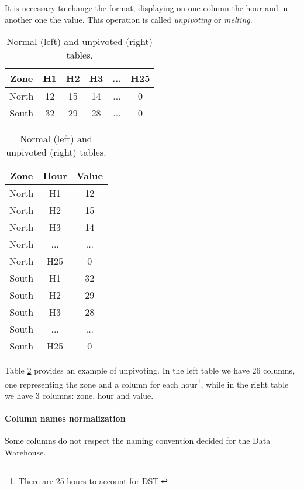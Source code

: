         It is necessary to change the format, displaying on one column the hour and in another one the value.
        This operation is called \textit{unpivoting} or \textit{melting}.
        
        \begin{table}
            \centering
            \begin{tabular}{|c|c c c c c|}
                \toprule
                 Zone  & H1 & H2 & H3 & ... & H25   \\
                 \midrule
                 North & 12 & 15 & 14 & ... & 0     \\
                 South & 32 & 29 & 28 & ... & 0     \\
                 \bottomrule
            \end{tabular}
            \quad
            \begin{tabular}{|c|c c|}
                \toprule
                 Zone  & Hour  & Value   \\
                 \midrule
                 North & H1    & 12     \\
                 North & H2    & 15     \\
                 North & H3    & 14     \\
                 North & ...   & ...    \\
                 North & H25   & 0      \\
                 South & H1    & 32     \\
                 South & H2    & 29     \\
                 South & H3    & 28     \\
                 South & ...   & ...    \\
                 South & H25   & 0      \\
                 \bottomrule
            \end{tabular}
            \caption{Normal (left) and unpivoted (right) tables.}
            \label{tab:etl:melt}
        \end{table}
        
        Table \ref{tab:etl:melt} provides an example of unpivoting.
        In the left table we have 26 columns, one representing the zone and a column for each hour\footnote{There are 25 hours to account for DST.}, while in the right table we have 3 columns: zone, hour and value.
    
    \paragraph{Column names normalization}
        Some columns do not respect the naming convention decided for the Data Warehouse.
        

